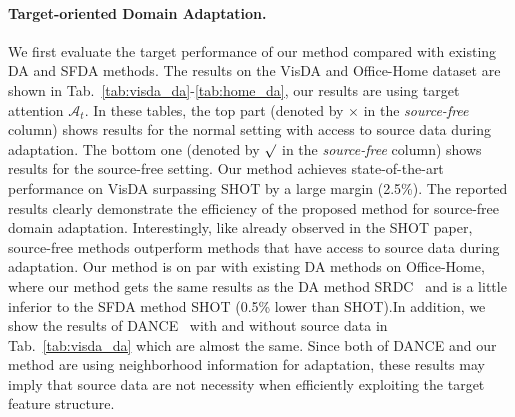 \documentclass[10pt,twocolumn,letterpaper]{article}
\begin{document}
\paragraph{Target-oriented Domain Adaptation.}
We first evaluate the target performance of our method compared with existing DA and SFDA methods. The results on the VisDA and Office-Home dataset are shown in Tab.~\ref{tab:visda_da}-\ref{tab:home_da}, our results are using target attention $\mathcal{A}_t$. In these tables, the top part (denoted by $\times$ in the \textit{source-free} column) shows results for the normal setting with access to source data during adaptation. The bottom one (denoted by $\surd$ in the \textit{source-free} column) shows results for the source-free setting. 
Our method achieves state-of-the-art performance on VisDA surpassing SHOT by a large margin (2.5\%). The reported results clearly demonstrate the efficiency of the proposed method for source-free domain adaptation. Interestingly, like already observed in the SHOT paper, source-free methods outperform methods that have access to source data during adaptation. Our method is on par with existing DA methods on Office-Home, where our method gets the same results as the DA method SRDC~\cite{tang2020unsupervised} and is a little inferior to the SFDA method SHOT (0.5\% lower than SHOT).{In addition, we show the results of DANCE~\cite{saito2020universal} with and without source data in Tab.~\ref{tab:visda_da} which are almost the same. Since both of DANCE and our method are using neighborhood information for adaptation, these results may imply that source data are not necessity when efficiently exploiting the target feature structure.}

\vspace{-2mm}
\end{document}
